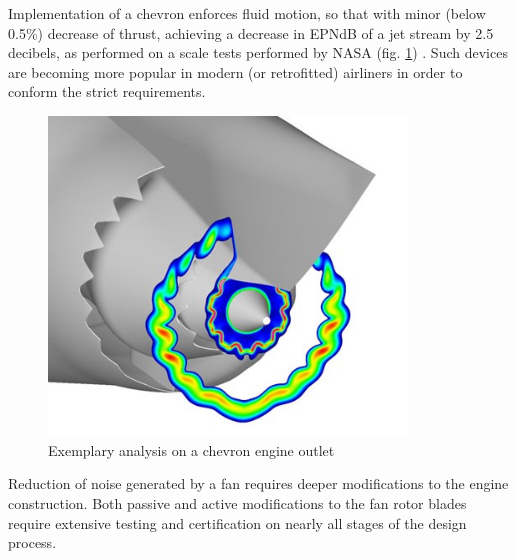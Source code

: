 Implementation of a chevron enforces fluid motion, so that with minor (below 0.5\%) decrease of thrust, achieving a decrease in EPNdB of a jet stream by 2.5 decibels, as performed on a scale tests performed by NASA (fig. \ref{chevron2}) \citep{methods}. Such devices are becoming more popular in modern (or retrofitted) airliners in order to conform the strict requirements.

\begin{figure}[h!]
\centering %
\includegraphics[width=0.85\textwidth]{Pictures/chevron2.jpg}
\caption{Exemplary analysis on a chevron engine outlet \citep{methods}}
\label{chevron2}
\end{figure}

Reduction of noise generated by a fan requires deeper modifications to the engine construction. Both passive and active modifications to the fan rotor blades require extensive testing and certification on nearly all stages of the design process. 